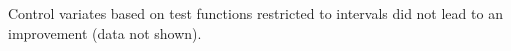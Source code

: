 Control variates based on test functions restricted to intervals did not lead to an improvement (data not shown).




